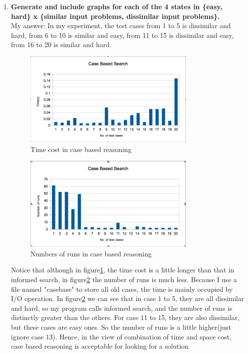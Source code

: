 \documentclass[12pt]{article}
\begin{document}
\begin{enumerate}
\item \textbf{Generate and include graphs for each of the 4 states in \{easy, hard\} x \{similar input problems, dissimilar input problems\}.}\\
My answer: In my experiment, the test cases from 1 to 5 is dissimilar and hard, from 6 to 10 is similar and easy, from 11 to 15 is dissimilar and easy, from 16 to 20 is similar and hard. 
\begin{figure}[H]
\centering
\includegraphics[width=0.8\textwidth]{Time_case.png}
\caption{Time cost in case based reasoning}
\label{fig:Time_case}
\end{figure}
\begin{figure}[H]
\centering
\includegraphics[width=0.8\textwidth]{Number_case.png}
\caption{Numbers of runs in case based reasoning}
\label{fig:Num_case}
\end{figure}
Notice that although in figure\ref{fig:Time_case}, the time cost is a little longer than that in informed search, in figure\ref{fig:Num_case} the number of runs is much less. Because I use a file named "casebase" to store all old cases, the time is mainly occupied by I/O operation. In figure\ref{fig:Num_case} we can see that in case 1 to 5, they are all dissimilar and hard, so my program calls informed search, and the number of runs is distinctly greater than the others. For case 11 to 15, they are also dissimilar, but these cases are easy ones. So the number of runs is a little higher(just ignore case 13). Hence, in the view of combination of time and space cost, case based reasoning is acceptable for looking for a solution. 

\end{enumerate}
\end{document}
